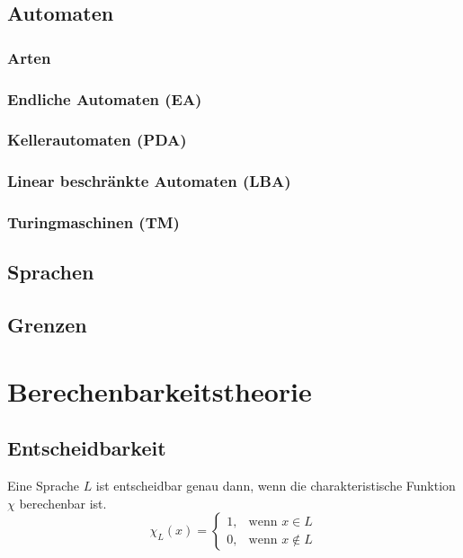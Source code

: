 \documentclass{article}
\begin{document}
\subsection{Automaten}
\subsubsection{Arten}
\subsubsection{Endliche Automaten (EA)}
\subsubsection{Kellerautomaten (PDA)}
\subsubsection{Linear beschränkte Automaten (LBA)}
\subsubsection{Turingmaschinen (TM)}
\subsection{Sprachen}
\subsection{Grenzen}
\section{Berechenbarkeitstheorie}
\subsection{Entscheidbarkeit}
Eine Sprache $L$ ist entscheidbar genau dann, wenn die charakteristische Funktion $\chi$ berechenbar ist.
\begin{equation}
    \chi _L(x)=
    \begin{cases}
        1, & \text{wenn } x\in L     \\
        0, & \text{wenn } x\not\in L
    \end{cases}
\end{equation}
\end{document}
